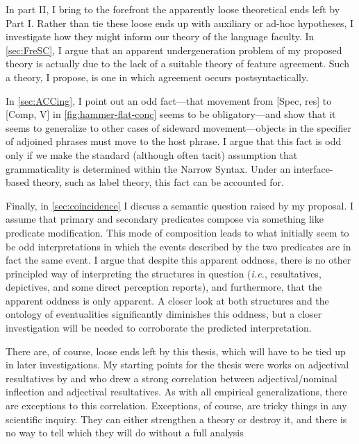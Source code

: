 In part II, I bring to the forefront the apparently loose theoretical ends left by Part I.
Rather than tie these loose ends up with auxiliary or ad-hoc hypotheses, I investigate how they might inform our theory of the language faculty.
In \cref{sec:FreSC}, I argue that an apparent undergeneration problem of my proposed theory is actually due to the lack of a suitable theory of feature agreement.
Such a theory, I propose, is one in which agreement occurs postsyntactically.

In \cref{sec:ACCing}, I point out an odd fact---that movement from [Spec, res] to [Comp, V] in \cref{fig:hammer-flat-conc} seems to be obligatory---and show that it seems to generalize to other cases of sideward movement---objects in the specifier of adjoined phrases must move to the host phrase.
I argue that this fact is odd only if we make the standard (although often tacit) assumption that grammaticality is determined within the Narrow Syntax.
Under an interface-based theory, such as label theory, this fact can be accounted for.

Finally, in \cref{sec:coincidence} I discuss a semantic question raised by my proposal.
I assume that primary and secondary predicates compose via something like predicate modification. 
This mode of composition leads to what initially seem to be odd interpretations in which the events described by the two predicates are in fact the same event.
I argue that despite this apparent oddness, there is no other principled way of interpreting the structures in question (\textit{i.e.}, resultatives, depictives, and some direct perception reports), and furthermore, that the apparent oddness is only apparent.
A closer look at both structures and the ontology of eventualities significantly diminishes this oddness, but a closer investigation will be needed to corroborate the predicted interpretation.

There are, of course, loose ends left by this thesis, which will have to be tied up in later investigations.
My starting points for the thesis were works on adjectival resultatives by \textcite{snyder1995language,snyder2001nature,snyder2016compound} and \textcite{kratzer2004building} who drew a strong correlation between adjectival/nominal inflection and adjectival resultatives.
As with all empirical generalizations, there are exceptions to this correlation.
Exceptions, of course, are tricky things in any scientific inquiry.
They can either strengthen a theory or destroy it, and there is no way to tell which they will do without a full analysis

